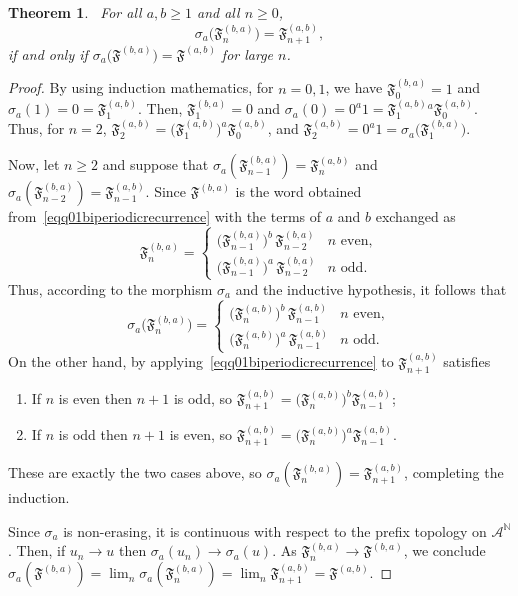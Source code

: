 \documentclass[12pt]{amsart}
\theoremstyle{plain}
\newtheorem{theorem}{Theorem}[section]
\theoremstyle{definition}
\theoremstyle{remark}
\newcommand{\N}{\mathbb{N}}
\newcommand{\AlphA}{\mathcal{A}}
\newcommand{\FD}{\mathfrak{F}}
\begin{document}
\begin{theorem}~\label{thm01desub}
For all $a,b\geqslant 1$ and all $n\geqslant 0$,
\[
  \sigma_a\bigl(\FD^{(b,a)}_n\bigr) = \FD^{(a,b)}_{n+1},
\]
if and only if  $\sigma_a\bigl(\FD^{(b,a)}\bigr) = \FD^{(a,b)}$ for large $n$.
\end{theorem}
\begin{proof}
By using induction mathematics, for $n=0,1$, we have $\FD^{(b,a)}_0=1$ and $\sigma_a(1)=0=\FD^{(a,b)}_1$. Then, $\FD^{(b,a)}_1=0$ and $\sigma_a(0)=0^a1=\FD^{(a,b)}_1{}^{a}\FD^{(a,b)}_0$. Thus, for $n=2$, $\FD^{(a,b)}_2=\bigl(\FD^{(a,b)}_1\bigr)^a \FD^{(a,b)}_0$, and $\FD^{(a,b)}_2=0^a1=\sigma_a\bigl(\FD^{(b,a)}_1\bigr)$.

Now, let $n\geqslant 2$ and suppose that $\sigma_a(\FD^{(b,a)}_{n-1})=\FD^{(a,b)}_n$ and $\sigma_a(\FD^{(b,a)}_{n-2})=\FD^{(a,b)}_{n-1}$. Since $\FD^{(b,a)}$ is the word obtained from~\eqref{eqq01biperiodicrecurrence} with the terms of $a$ and $b$ exchanged as
\[
  \FD^{(b,a)}_n =
  \begin{cases}
    \bigl(\FD^{(b,a)}_{n-1}\bigr)^{b}\, \FD^{(b,a)}_{n-2} & n \text{ even},\\[2pt]
    \bigl(\FD^{(b,a)}_{n-1}\bigr)^{a}\, \FD^{(b,a)}_{n-2} & n \text{ odd}.
  \end{cases}
\]
Thus, according to the morphism $\sigma_a$  and the inductive hypothesis, it follows that 
\[
  \sigma_a\bigl(\FD^{(b,a)}_n\bigr) =
  \begin{cases}
    \bigl(\FD^{(a,b)}_{n}\bigr)^{b}\, \FD^{(a,b)}_{n-1} & n \text{ even},\\[2pt]
    \bigl(\FD^{(a,b)}_{n}\bigr)^{a}\, \FD^{(a,b)}_{n-1} & n \text{ odd}.
  \end{cases}
\]
On the other hand, by applying~\eqref{eqq01biperiodicrecurrence} to
$\FD^{(a,b)}_{n+1}$ satisfies
\begin{enumerate}
    \item If $n$ is even then $n+1$ is odd, so $\FD^{(a,b)}_{n+1}=\bigl(\FD^{(a,b)}_n\bigr)^b \FD^{(a,b)}_{n-1}$;
    \item If $n$ is odd then $n+1$ is even, so $\FD^{(a,b)}_{n+1}=\bigl(\FD^{(a,b)}_n\bigr)^a
\FD^{(a,b)}_{n-1}$.
\end{enumerate}
 These are exactly the two cases above, so $\sigma_a(\FD^{(b,a)}_n)=\FD^{(a,b)}_{n+1}$, completing the induction.

Since $\sigma_a$ is non-erasing, it is continuous with respect to the prefix topology on $\AlphA ^{\N}$. Then, if $u_n\to u$ then $\sigma_a(u_n)\to\sigma_a(u)$. As $\FD^{(b,a)}_n\to
\FD^{(b,a)}$, we conclude $\sigma_a(\FD^{(b,a)})=\lim_n
\sigma_a(\FD^{(b,a)}_n)=\lim_n \FD^{(a,b)}_{n+1}=\FD^{(a,b)}$.
\end{proof}
\end{document}
